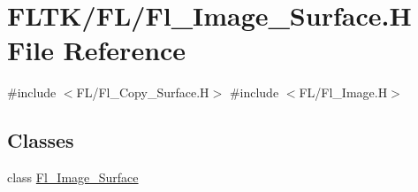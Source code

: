 \hypertarget{_fl___image___surface_8_h}{}\section{F\+L\+T\+K/\+F\+L/\+Fl\+\_\+\+Image\+\_\+\+Surface.H File Reference}
\label{_fl___image___surface_8_h}
{\ttfamily \#include $<$F\+L/\+Fl\+\_\+\+Copy\+\_\+\+Surface.\+H$>$}\newline
{\ttfamily \#include $<$F\+L/\+Fl\+\_\+\+Image.\+H$>$}\newline
\subsection*{Classes}
\begin{DoxyCompactItemize}
\item 
class \hyperlink{class_fl___image___surface}{Fl\+\_\+\+Image\+\_\+\+Surface}
\end{DoxyCompactItemize}

